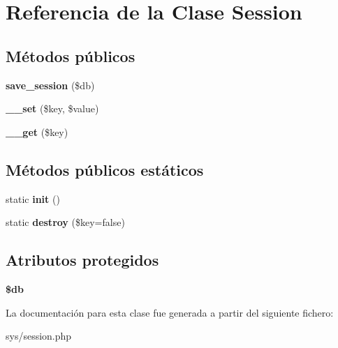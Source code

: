\hypertarget{class_session}{}\section{Referencia de la Clase Session}
\label{class_session}
\subsection*{Métodos públicos}
\begin{DoxyCompactItemize}
\item 
\hypertarget{class_session_a630ed254117528083a87c0e30f1e8eab}{}{\bfseries save\+\_\+session} (\$db)\label{class_session_a630ed254117528083a87c0e30f1e8eab}

\item 
\hypertarget{class_session_a79b36d71c6f1d4f9e6c4c3e34c081456}{}{\bfseries \+\_\+\+\_\+set} (\$key, \$value)\label{class_session_a79b36d71c6f1d4f9e6c4c3e34c081456}

\item 
\hypertarget{class_session_a4537dad3b44254124991341cc91b28fb}{}{\bfseries \+\_\+\+\_\+get} (\$key)\label{class_session_a4537dad3b44254124991341cc91b28fb}

\end{DoxyCompactItemize}
\subsection*{Métodos públicos estáticos}
\begin{DoxyCompactItemize}
\item 
\hypertarget{class_session_a9f0be6ae273d3669e11c29910a0be338}{}static {\bfseries init} ()\label{class_session_a9f0be6ae273d3669e11c29910a0be338}

\item 
\hypertarget{class_session_a606e29124233412b3db261bb6078d4a0}{}static {\bfseries destroy} (\$key=false)\label{class_session_a606e29124233412b3db261bb6078d4a0}

\end{DoxyCompactItemize}
\subsection*{Atributos protegidos}
\begin{DoxyCompactItemize}
\item 
\hypertarget{class_session_a1fa3127fc82f96b1436d871ef02be319}{}{\bfseries \$db}\label{class_session_a1fa3127fc82f96b1436d871ef02be319}

\end{DoxyCompactItemize}


La documentación para esta clase fue generada a partir del siguiente fichero\+:\begin{DoxyCompactItemize}
\item 
sys/session.\+php\end{DoxyCompactItemize}
